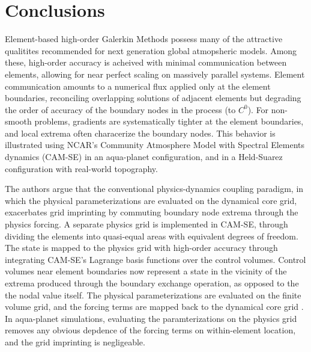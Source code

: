 \documentclass[twocol]{ametsoc}
\begin{document}




\section{Conclusions}

Element-based high-order Galerkin Methods possess many of the attractive qualitites recommended for next generation global atmopsheric models. Among these, high-order accuracy is acheived with minimal communication between elements, allowing for near perfect scaling on massively parallel systems. Element communication amounts to a numerical flux applied only at the element boundaries, reconciling overlapping solutions of adjacent elements but degrading the order of accuracy of the boundary nodes in the process (to $C^0$). For non-smooth problems, gradients are systematically tighter at the element boundaries, and local extrema often characerize the boundary nodes. This behavior is illustrated using NCAR's Community Atmosphere Model with Spectral Elements dynamics (CAM-SE) in an aqua-planet configuration, and in a Held-Suarez configuration with real-world topography. 

The authors argue that the conventional physics-dynamics coupling paradigm, in which the physical parameterizations are evaluated on the dynamical core grid, exacerbates grid imprinting by commuting boundary node extrema through the physics forcing. A separate physics grid is implemented in CAM-SE, through dividing the elements into quasi-equal areas with equivalent degrees of freedom. The state is mapped to the physics grid with high-order accuracy through integrating CAM-SE's Lagrange basis functions over the control volumes. Control volumes near element boundaries now represent a state in the vicinity of the extrema produced through the boundary exchange operation, as opposed to the the nodal value itself. The physical parameterizations are evaluated on the finite volume grid, and the forcing terms are mapped back to the dynamical core grid {\color{red}{discuss mapping back}}. In aqua-planet simulations, evaluating the paramterizations on the physics grid removes any obvious depdence of the forcing terms on within-element location, and the grid imprinting is negligeable.
\end{document}
